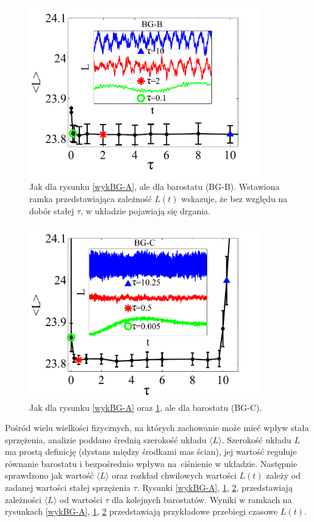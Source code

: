 \documentclass[12pt,a4paper,openright]{report} %
\begin{document}
\begin{figure}
\centering
\includegraphics[width=100mm]{rysunki/BG-B.pdf}
\caption{Jak dla rysunku \ref{wykBG-A}, ale dla barostatu (BG-B). Wstawiona ramka przedstawiająca zależność $L(t)$ wskazuje, że bez względu na dobór stałej $\tau$, w układzie pojawiają się drgania.}
\label{wykBG-B}
\end{figure}
\begin{figure}
\centering
\includegraphics[width=100mm]{rysunki/BG-C.pdf}
\caption{Jak dla rysunku \ref{wykBG-A} oraz \ref{wykBG-B}, ale dla barostatu (BG-C).}
\label{wykBG-C}
\end{figure}
%
\begin{samepage}
Pośród wielu wielkości fizycznych, na których zachowanie może mieć wpływ stała sprzężenia, analizie poddano średnią szerokość układu $\langle L \rangle$. Szerokość układu $L$ ma prostą definicję (dystans między środkami mas ścian), jej wartość reguluje równanie barostatu i bezpośrednio wpływa na~ciśnienie w układzie. Następnie sprawdzono jak wartość $\langle L \rangle$ oraz rozkład chwilowych wartości $L(t)$ zależy od zadanej wartości stałej sprzężenia $\tau$. Rysunki \ref{wykBG-A}, \ref{wykBG-B}, \ref{wykBG-C}, przedstawiają zależności $\langle L \rangle$ od wartości $\tau$ dla kolejnych barostatów. \linebreak Wyniki w ramkach na rysunkach \ref{wykBG-A}, \ref{wykBG-B}, \ref{wykBG-C} przedstawiają przykładowe przebiegi czasowe $L(t)$. 
\end{samepage}
%
%
%
\end{document}
